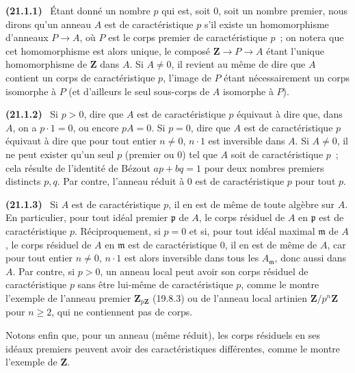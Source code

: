 \documentclass[10pt,oneside]{book}
\makeatletter
\newcommand{\setmanualcurrentlabel}[1]{\def\@currentlabel{#1}}
\newenvironment{env}[1][]{\setmanualcurrentlabel{#1}\par\medskip\noindent\textbf{(#1)}\ }{\par}
\makeatother
\begin{document}
\begin{env}[21.1.1]
\label{0.21.1.1-fr}
Étant donné un nombre $p$ qui est, soit $0$, soit un nombre premier, nous
dirons qu'un anneau $A$ est de caractéristique $p$ s'il existe un homomorphisme
d'anneaux $P\to A$, où $P$ est le corps premier de caractéristique $p$~; on
notera que cet homomorphisme est alors unique, le composé
$\mathbf Z\to P\to A$ étant l'unique homomorphisme de $\mathbf Z$ dans $A$.
Si $A\neq0$, il revient au même de dire que $A$ contient un corps de
caractéristique $p$, l'image de $P$ étant nécessairement un corps isomorphe à
$P$ (et d'ailleurs le seul sous-corps de $A$ isomorphe à $P$).
\end{env}

\begin{env}[21.1.2]
\label{0.21.1.2-fr}
Si $p>0$, dire que $A$ est de caractéristique $p$ équivaut à dire que, dans
$A$, on a $p\cdot1=0$, ou encore $pA=0$. Si $p=0$, dire que $A$ est de
caractéristique $p$ équivaut à dire que pour tout entier $n\neq0$, $n\cdot1$
est inversible dans $A$. Si $A\neq0$, il ne peut exister qu'un seul $p$
(premier ou $0$) tel que $A$ soit de caractéristique $p$~; cela résulte de
l'identité de Bézout $ap+bq=1$ pour deux nombres premiers distincts $p,q$.
Par contre, l'anneau réduit à $0$ est de caractéristique $p$ pour tout $p$.
\end{env}

\begin{env}[21.1.3]
\label{0.21.1.3-fr}
Si $A$ est de caractéristique $p$, il en est de même de toute algèbre sur
$A$. En particulier, pour tout idéal premier $\mathfrak p$ de $A$, le corps
résiduel de $A$ en $\mathfrak p$ est de caractéristique $p$. Réciproquement,
si $p=0$ et si, pour tout idéal maximal $\mathfrak m$ de $A$, le corps
résiduel de $A$ en $\mathfrak m$ est de caractéristique $0$, il en est de même
de $A$, car pour tout entier $n\neq0$, $n\cdot1$ est alors inversible dans
tous les $A_{\mathfrak m}$, donc aussi dans $A$. Par contre, si $p>0$, un
anneau local peut avoir son corps résiduel de caractéristique $p$ sans être
lui-même de caractéristique $p$, comme le montre l'exemple de l'anneau
premier $\mathbf Z_{p\mathbf Z}$ (19.8.3) ou de l'anneau local artinien
$\mathbf Z/p^n\mathbf Z$ pour $n\geq2$, qui ne contiennent pas de corps.

Notons enfin que, pour un anneau (même réduit), les corps résiduels en ses
idéaux premiers peuvent avoir des caractéristiques différentes, comme le
montre l'exemple de $\mathbf Z$.
\end{env}
\end{document}
